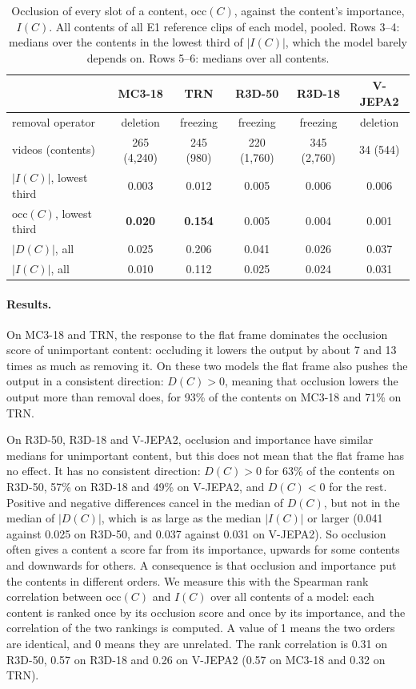 \begin{table}[h]
\centering
\caption{Occlusion of every slot of a content, $\mathrm{occ}(C)$, against the content's importance, $I(C)$. All contents of all E1 reference clips of each model, pooled. Rows 3--4: medians over the contents in the lowest third of $|I(C)|$, which the model barely depends on. Rows 5--6: medians over all contents.}
\label{tab:flat-frame}
\begin{tabular}{lccccc}
\toprule
 & MC3-18 & TRN & R3D-50 & R3D-18 & V-JEPA2 \\
\midrule
removal operator & deletion & freezing & freezing & freezing & deletion \\
videos (contents) & 265 (4{,}240) & 245 (980) & 220 (1{,}760) & 345 (2{,}760) & 34 (544) \\
$|I(C)|$, lowest third & 0.003 & 0.012 & 0.005 & 0.006 & 0.006 \\
$\mathrm{occ}(C)$, lowest third & \textbf{0.020} & \textbf{0.154} & 0.005 & 0.004 & 0.001 \\
$|D(C)|$, all & 0.025 & 0.206 & 0.041 & 0.026 & 0.037 \\
$|I(C)|$, all & 0.010 & 0.112 & 0.025 & 0.024 & 0.031 \\
\bottomrule
\end{tabular}
\end{table}

\paragraph{Results.}
On MC3-18 and TRN, the response to the flat frame dominates the occlusion score of unimportant content: occluding it lowers the output by about 7 and 13 times as much as removing it.
On these two models the flat frame also pushes the output in a consistent direction: $D(C) > 0$, meaning that occlusion lowers the output more than removal does, for 93\% of the contents on MC3-18 and 71\% on TRN.

On R3D-50, R3D-18 and V-JEPA2, occlusion and importance have similar medians for unimportant content, but this does not mean that the flat frame has no effect.
It has no consistent direction: $D(C) > 0$ for 63\% of the contents on R3D-50, 57\% on R3D-18 and 49\% on V-JEPA2, and $D(C) < 0$ for the rest.
Positive and negative differences cancel in the median of $D(C)$, but not in the median of $|D(C)|$, which is as large as the median $|I(C)|$ or larger (0.041 against 0.025 on R3D-50, and 0.037 against 0.031 on V-JEPA2).
So occlusion often gives a content a score far from its importance, upwards for some contents and downwards for others.
A consequence is that occlusion and importance put the contents in different orders.
We measure this with the Spearman rank correlation between $\mathrm{occ}(C)$ and $I(C)$ over all contents of a model: each content is ranked once by its occlusion score and once by its importance, and the correlation of the two rankings is computed.
A value of 1 means the two orders are identical, and 0 means they are unrelated.
The rank correlation is 0.31 on R3D-50, 0.57 on R3D-18 and 0.26 on V-JEPA2 (0.57 on MC3-18 and 0.32 on TRN).

